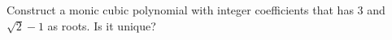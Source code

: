 Construct a monic cubic polynomial with integer coefficients that has $3$ and $\sqrt2-1$ as roots. Is it unique?
